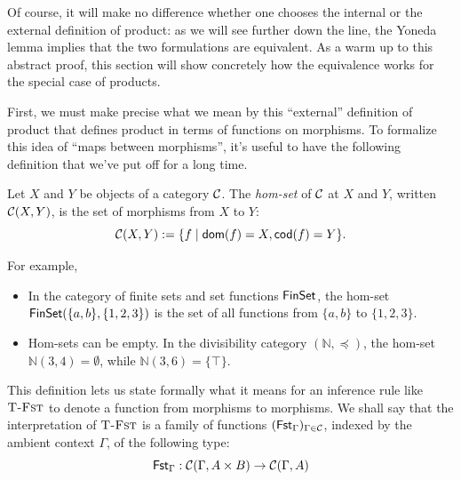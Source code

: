 Of course, it will make no difference whether one chooses the internal
or the external definition of product: as we will see further down the line,
the Yoneda lemma implies that the two formulations are equivalent.
As a warm up to this abstract proof, this section will show
concretely how the equivalence works for the special case of products.

First, we must make precise what we mean by this ``external'' definition of product
that defines product in terms of functions on morphisms.
To formalize this idea of ``maps between morphisms'',
  it's useful to have the following definition that we've put off for a long time.

\begin{definition}
  Let \(X\) and \(Y\) be objects of a category \(\mathcal C\).
  The \emph{hom-set} of $\mathcal C$ at $X$ and $Y$, 
  written \(\mathcal C(X,Y)\),
  is the set of morphisms from \(X\) to \(Y\):
  \[
  \mathcal C(X,Y) := \{f \mid \operatorname{\mathsf{dom}}(f) = X, \operatorname{\mathsf{cod}}(f) = Y\}.
  \]
\end{definition}
For example, \begin{itemize}
\item In the category of finite sets and set functions $\mathsf{FinSet}$, the
  hom-set $\mathsf{FinSet}(\{a,b\}, \{1, 2, 3\})$ is the set of all functions
  from $\{a,b\}$ to $\{1, 2, 3\}$.
\item Hom-sets can be empty. In the divisibility category $(\mathbb{N}, \preceq)$,
the hom-set $\mathbb{N}(3,4) = \emptyset$, while $\mathbb{N}(3, 6) = \{\top\}$.
\end{itemize}
This definition lets us state formally what it means for an inference rule
like \(\textsc{T-Fst}\) to denote a function from morphisms to morphisms.
We shall say that the interpretation of \(\textsc{T-Fst}\) is
a family of functions \((\mathsf{Fst}_\Gamma)_{\Gamma\in\mathcal C}\),
indexed by the ambient context \(\Gamma\),
of the following type:
\[
\mathsf{Fst}_\Gamma : \mathcal C(\Gamma, A \times B) \to \mathcal C(\Gamma, A)
\]


